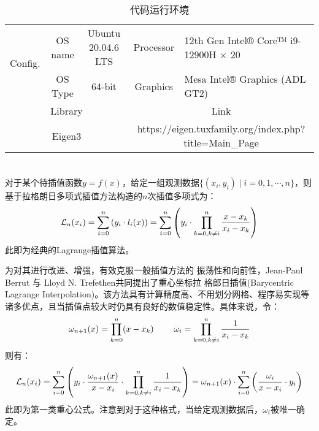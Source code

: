 \documentclass[12pt, onecolumn]{article}
\newcommand\normf{\fangsong}
\begin{document}
		\begin{table}[h]
		\centering
		\caption{\normf 代码运行环境}
		\label{tab:代码运行环境}
		\vspace{2mm}
		\begin{tabular}{ccc|cl}
		\toprule
		\multicolumn{1}{c|}{\multirow{2}{*}{Config.}} & OS name & Ubuntu 20.04.6 LTS & Processor              & 12th Gen Intel® Core™ i9-12900H × 20              \\ \cmidrule{2-5} 
		\multicolumn{1}{c|}{}                         & OS Type & 64-bit             & Graphics               & Mesa Intel® Graphics (ADL GT2)                    \\ \midrule[1pt]\midrule[1pt]
		\multicolumn{3}{c|}{Library}                                                 & \multicolumn{2}{c}{Link}                                                   \\ \midrule
		\multicolumn{3}{c|}{Eigen3}                                                  & \multicolumn{2}{c}{https://eigen.tuxfamily.org/index.php?title=Main\_Page}              \\ \bottomrule
		\end{tabular}
		\end{table}
		
	\section{\normf{拉格朗日重心插值}}
	对于某个待插值函数$y=f(x)$，给定一组观测数据$\{(x_i,y_i)\mid i = 0,1,\cdots,n\}$，则基于拉格朗日多项式插值方法构造的$n$次插值多项式为：
	\begin{equation}
	\large
	\mathcal{L}_n(x_i)=\sum_{i=0}^{n}\left( 
	y_i\cdot l_i(x)
	\right) =\sum_{i=0}^{n}\left( 
		y_i\cdot\prod_{k=0,k\ne i}^{n}\frac{x-x_k}{x_i-x_k}
		\right) 
	\end{equation}
	此即为经典的Lagrange插值算法。
	
	为对其进行改进、增强，有效克服一般插值方法的
	振荡性和向前性，Jean-Paul Berrut 与 Lloyd N.	Trefethen共同提出了重心坐标拉
	格郎日插值(Barycentric Lagrange Interpolation)。该方法具有计算精度高、不用划分网格、程序易实现等诸多优点，且当插值点较大时仍具有良好的数值稳定性。具体来说，令：
	\begin{equation}
	\large
	\omega_{n+1}(x)=\prod_{k=0}^{n}(x-x_k)
	\qquad
	\omega_i=\prod_{k=0,k\ne i}^{n}\frac{1}{x_i-x_k}
	\end{equation}
	则有：
	\begin{equation}
	\large
	\mathcal{L}_n(x_i)=\sum_{i=0}^{n}\left( 
		y_i
		\cdot\frac{\omega_{n+1}(x)}{x-x_i}
		\cdot\prod_{k=0,k\ne i}^{n}\frac{1}{x_i-x_k}
		\right) =\omega_{n+1}(x)\cdot\sum_{i=0}^{n}\left( 
				\frac{\omega_i}{x-x_i}\cdot y_i
				\right)
	\end{equation}
	此即为第一类重心公式。注意到对于这种格式，当给定观测数据后，$\omega_i$被唯一确定。
	
\end{document}

